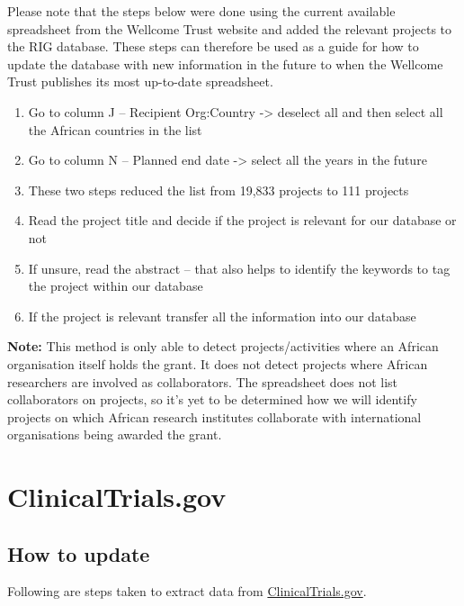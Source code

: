 \documentclass[
]{book}
\begin{document}
Please note that the steps below were done using the current available spreadsheet from the Wellcome Trust website and added the relevant projects to the RIG database. These steps can therefore be used as a guide for how to update the database with new information in the future to when the Wellcome Trust publishes its most up-to-date spreadsheet.

\begin{enumerate}
\def\labelenumi{\arabic{enumi}.}
\item
  Go to column J -- Recipient Org:Country -\textgreater{} deselect all and then select all the African countries in the list
\item
  Go to column N -- Planned end date -\textgreater{} select all the years in the future
\item
  These two steps reduced the list from 19,833 projects to 111 projects
\item
  Read the project title and decide if the project is relevant for our database or not
\item
  If unsure, read the abstract -- that also helps to identify the keywords to tag the project within our database
\item
  If the project is relevant transfer all the information into our database
\end{enumerate}

\textbf{Note:} This method is only able to detect projects/activities where an African organisation itself holds the grant. It does not detect projects where African researchers are involved as collaborators. The spreadsheet does not list collaborators on projects, so it's yet to be determined how we will identify projects on which African research institutes collaborate with international organisations being awarded the grant.

\hypertarget{update-clinicaltrials}{%
\section{ClinicalTrials.gov}\label{update-clinicaltrials}}

\hypertarget{how-to-update-1}{%
\subsection{How to update}\label{how-to-update-1}}

Following are steps taken to extract data from \href{https://clinicaltrials.gov/}{ClinicalTrials.gov}.
\end{document}
